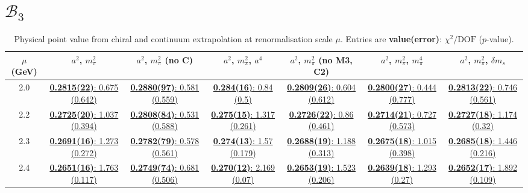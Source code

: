 \documentclass[12pt]{extarticle}
\begin{document}
\section{$\mathcal{B}_3$}
\begin{table}[h!]
\begin{center}
\begin{tabular}{|c|c|c|c|c|c|c|}
\hline
$\mu$ (GeV) & $a^2$, $m_\pi^2$& $a^2$, $m_\pi^2$ (no C)& $a^2$, $m_\pi^2$, $a^4$& $a^2$, $m_\pi^2$ (no M3, C2)& $a^2$, $m_\pi^2$, $m_\pi^4$& $a^2$, $m_\pi^2$, $\delta m_s$\\
\hline
2.0& \hyperlink{SSmPP/SUSY/bag_a2m2_20.pdf.1}{\textbf{0.2815(22)}: 0.675 (0.642)} & \hyperlink{SSmPP/SUSY/bag_a2m2noC_20.pdf.1}{\textbf{0.2880(97)}: 0.581 (0.559)} & \hyperlink{SSmPP/SUSY/bag_a2a4m2_20.pdf.1}{\textbf{0.284(16)}: 0.84 (0.5)} & \hyperlink{SSmPP/SUSY/bag_a2m2mcut_20.pdf.1}{\textbf{0.2809(26)}: 0.604 (0.612)} & \hyperlink{SSmPP/SUSY/bag_a2m2m4_20.pdf.1}{\textbf{0.2800(27)}: 0.444 (0.777)} & \hyperlink{SSmPP/SUSY/bag_a2m2delm_20.pdf.1}{\textbf{0.2813(22)}: 0.746 (0.561)}\\
2.2& \hyperlink{SSmPP/SUSY/bag_a2m2_22.pdf.1}{\textbf{0.2725(20)}: 1.037 (0.394)} & \hyperlink{SSmPP/SUSY/bag_a2m2noC_22.pdf.1}{\textbf{0.2808(84)}: 0.531 (0.588)} & \hyperlink{SSmPP/SUSY/bag_a2a4m2_22.pdf.1}{\textbf{0.275(15)}: 1.317 (0.261)} & \hyperlink{SSmPP/SUSY/bag_a2m2mcut_22.pdf.1}{\textbf{0.2726(22)}: 0.86 (0.461)} & \hyperlink{SSmPP/SUSY/bag_a2m2m4_22.pdf.1}{\textbf{0.2714(21)}: 0.727 (0.573)} & \hyperlink{SSmPP/SUSY/bag_a2m2delm_22.pdf.1}{\textbf{0.2727(18)}: 1.174 (0.32)}\\
2.3& \hyperlink{SSmPP/SUSY/bag_a2m2_23.pdf.1}{\textbf{0.2691(16)}: 1.273 (0.272)} & \hyperlink{SSmPP/SUSY/bag_a2m2noC_23.pdf.1}{\textbf{0.2782(79)}: 0.578 (0.561)} & \hyperlink{SSmPP/SUSY/bag_a2a4m2_23.pdf.1}{\textbf{0.274(13)}: 1.57 (0.179)} & \hyperlink{SSmPP/SUSY/bag_a2m2mcut_23.pdf.1}{\textbf{0.2688(19)}: 1.188 (0.313)} & \hyperlink{SSmPP/SUSY/bag_a2m2m4_23.pdf.1}{\textbf{0.2675(18)}: 1.015 (0.398)} & \hyperlink{SSmPP/SUSY/bag_a2m2delm_23.pdf.1}{\textbf{0.2685(18)}: 1.446 (0.216)}\\
2.4& \hyperlink{SSmPP/SUSY/bag_a2m2_24.pdf.1}{\textbf{0.2651(16)}: 1.763 (0.117)} & \hyperlink{SSmPP/SUSY/bag_a2m2noC_24.pdf.1}{\textbf{0.2749(74)}: 0.681 (0.506)} & \hyperlink{SSmPP/SUSY/bag_a2a4m2_24.pdf.1}{\textbf{0.270(12)}: 2.169 (0.07)} & \hyperlink{SSmPP/SUSY/bag_a2m2mcut_24.pdf.1}{\textbf{0.2653(19)}: 1.523 (0.206)} & \hyperlink{SSmPP/SUSY/bag_a2m2m4_24.pdf.1}{\textbf{0.2639(18)}: 1.293 (0.27)} & \hyperlink{SSmPP/SUSY/bag_a2m2delm_24.pdf.1}{\textbf{0.2652(17)}: 1.892 (0.109)}\\
\hline
\end{tabular}
\caption{Physical point value from chiral and continuum extrapolation at renormalisation scale $\mu$. Entries are \textbf{value(error)}: $\chi^2/\text{DOF}$ ($p$-value).}
\end{center}
\end{table}
\end{document}
